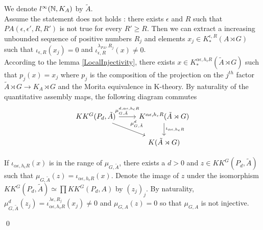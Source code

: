 \begin{dem}
We denote $l^\infty(\mathbb N,K_A)$ by $\tilde A$.\\
Assume the statement does not holds : there exists $\epsilon$ and $R$ such that $PA(\epsilon,\epsilon',R,R')$ is not true for every $R'\geq R$. Then we can extract a increasing unbounded sequence of positive numbers $R_j$ and elements $x_j\in K_*^{\epsilon,R}(A\rtimes G)$ such that $\iota_{\epsilon,R}(x_j)=0$ and $\iota_{\epsilon,R}^{\lambda_{PA},R_j}(x)\neq 0$. \\
According to the lemma \ref{LocalInjectivity}, there exists $x\in K_*^{\alpha\epsilon,h_\epsilon R}(\tilde A\rtimes G)$ such that $p_j(x)=x_j$ where $p_j$ is the composition of the projection on the $j^{th}$ factor $\tilde A \rtimes G \rightarrow K_A \rtimes G$ and the Morita equivalence in K-theory.
By naturality of the quantitative assembly maps, the following diagram commutes
\[\begin{tikzcd}
KK^G(P_d,\tilde A) \arrow{r}{\mu_{G,\tilde A}^{d,\alpha\epsilon, h_\epsilon R}} \arrow{rd}{\mu_{G,\tilde A}^d} & K^{\alpha\epsilon,h_\epsilon R}(\tilde A\rtimes G) \arrow{d}{\iota_{\alpha\epsilon, h_\epsilon R}}\\
                                                      \                          & K(\tilde A\rtimes G)
\end{tikzcd}\]

If $\iota_{\alpha\epsilon,h_\epsilon R}(x)$ is in the range of $\mu_{G,\tilde A}$, there exists a $d>0$ and $z\in KK^G(P_d,\tilde A)$ such that $\mu_{G,\tilde A}(z)=\iota_{\alpha\epsilon,h_\epsilon R}(x)$. Denote the image of $z$ under the isomorphism $KK^G(P_d,\tilde A) \simeq \prod KK^G(P_d,A)$ by $(z_j)_j$. By naturality, $\mu_{G,\tilde A}^d(z_j)=\iota_{\alpha\epsilon,h_\epsilon R}^{\lambda\epsilon,R_j}(x_j)\neq 0$ and $\mu_{G,A}(z)=0$ so that $\mu_{G,A}$ is not injective.

\qed
\end{dem}

